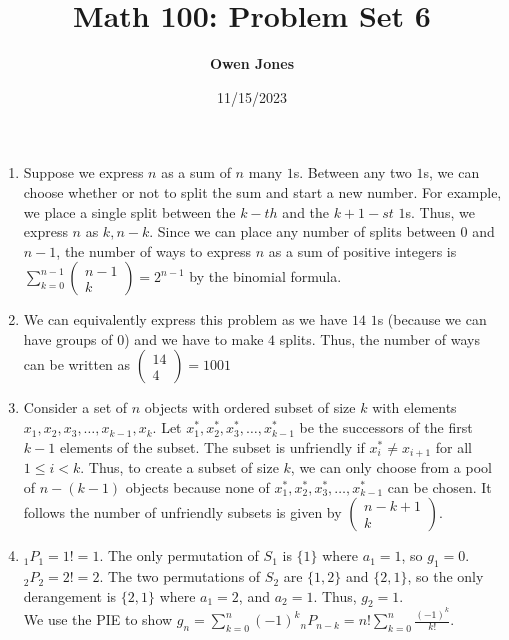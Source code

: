 \documentclass[10pt]{article}
\title{\bf Math 100: Problem Set 6}
\date{11/15/2023}
\author{\bf Owen Jones}
\begin{document}
\maketitle
\begin{enumerate}[label= (Q-\arabic*)]
    \item Suppose we express $n$ as a sum of $n$ many $1$s. 
    Between any two $1$s, we can choose whether or not to split the sum and start a new number. 
    For example, we place a single split between the $k-th$ and the $k+1-st$ $1$s. 
    Thus, we express $n$ as $k,n-k$.
    Since we can place any number of splits between $0$ and $n-1$, the number of ways to express $n$ as a sum of positive integers is $\displaystyle\sum_{k=0}^{n-1}\begin{pmatrix}
        n-1\\
        k
    \end{pmatrix}=2^{n-1}$ by the binomial formula.
    \item We can equivalently express this problem as we have $14$ $1$s (because we can have groups of $0$) and we have to make $4$ splits. Thus, the number of ways can be written as $\begin{pmatrix}
        14\\
        4
    \end{pmatrix}=1001$
    \item Consider a set of $n$ objects with ordered subset of size $k$ with elements $x_1,x_2,x_3,\ldots, x_{k-1},x_k$. 
    Let $x_1^*,x_2^*,x_3^*,\ldots, x_{k-1}^*$ be the successors of the first $k-1$ elements of the subset.
    The subset is unfriendly if $x_i^*\neq x_{i+1}$ for all $1\le i<k$. 
    Thus, to create a subset of size $k$, we can only choose from a pool of $n-(k-1)$ objects because none of $x_1^*,x_2^*,x_3^*,\ldots, x_{k-1}^*$ can be chosen.
    It follows the number of unfriendly subsets is given by $\begin{pmatrix}
        n-k+1\\
        k
    \end{pmatrix}$.
    \item $_1P_1=1!=1$. The only permutation of $S_1$ is $\{1\}$ where $a_1=1$, so $g_1=0$.\\
    $_2P_2=2!=2$. The two permutations of $S_2$ are $\{1,2\}$ and $\{2,1\}$, so the only derangement is $\{2,1\}$ where $a_1=2$, and $a_2=1$. Thus, $g_2=1$.\\
    We use the PIE to show $g_n=\displaystyle \sum_{k=0}^{n}{(-1)}^k {_nP_{n-k}}=n!\sum_{k=0}^{n}\frac{{(-1)}^k}{k!}$.\\

\end{enumerate}
\end{document}
